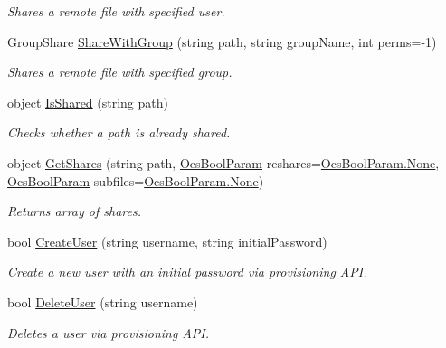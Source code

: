 \begin{DoxyCompactItemize}
\begin{DoxyCompactList}\small\item\em Shares a remote file with specified user. \end{DoxyCompactList}\item 
Group\+Share \hyperlink{classowncloudsharp_1_1_client_a22625407b475bd43c292fc80fbcebad9}{Share\+With\+Group} (string path, string group\+Name, int perms=-\/1)
\begin{DoxyCompactList}\small\item\em Shares a remote file with specified group. \end{DoxyCompactList}\item 
object \hyperlink{classowncloudsharp_1_1_client_a41a8332fe5bb195c2c9aea82e92d49d7}{Is\+Shared} (string path)
\begin{DoxyCompactList}\small\item\em Checks whether a path is already shared. \end{DoxyCompactList}\item 
object \hyperlink{classowncloudsharp_1_1_client_a90be733e59a3c41a4131e1a847d92d8d}{Get\+Shares} (string path, \hyperlink{namespaceowncloudsharp_a7d494b18f174086318df1bdf916068b5}{Ocs\+Bool\+Param} reshares=\hyperlink{namespaceowncloudsharp_a86ba7b86b85c7f5be2304a1ef7ae3157a6adf97f83acf6453d4a6a4b1070f3754}{Ocs\+Bool\+Param.\+None}, \hyperlink{namespaceowncloudsharp_a7d494b18f174086318df1bdf916068b5}{Ocs\+Bool\+Param} subfiles=\hyperlink{namespaceowncloudsharp_a86ba7b86b85c7f5be2304a1ef7ae3157a6adf97f83acf6453d4a6a4b1070f3754}{Ocs\+Bool\+Param.\+None})
\begin{DoxyCompactList}\small\item\em Returns array of shares. \end{DoxyCompactList}\item 
bool \hyperlink{classowncloudsharp_1_1_client_a7e285455e3f0cf437d9359956b6feaa5}{Create\+User} (string username, string initial\+Password)
\begin{DoxyCompactList}\small\item\em Create a new user with an initial password via provisioning A\+P\+I. \end{DoxyCompactList}\item 
bool \hyperlink{classowncloudsharp_1_1_client_a0603de03c323c55dc53cea24516ecf31}{Delete\+User} (string username)
\begin{DoxyCompactList}\small\item\em Deletes a user via provisioning A\+P\+I. \end{DoxyCompactList}\item 

\end{DoxyCompactItemize}
